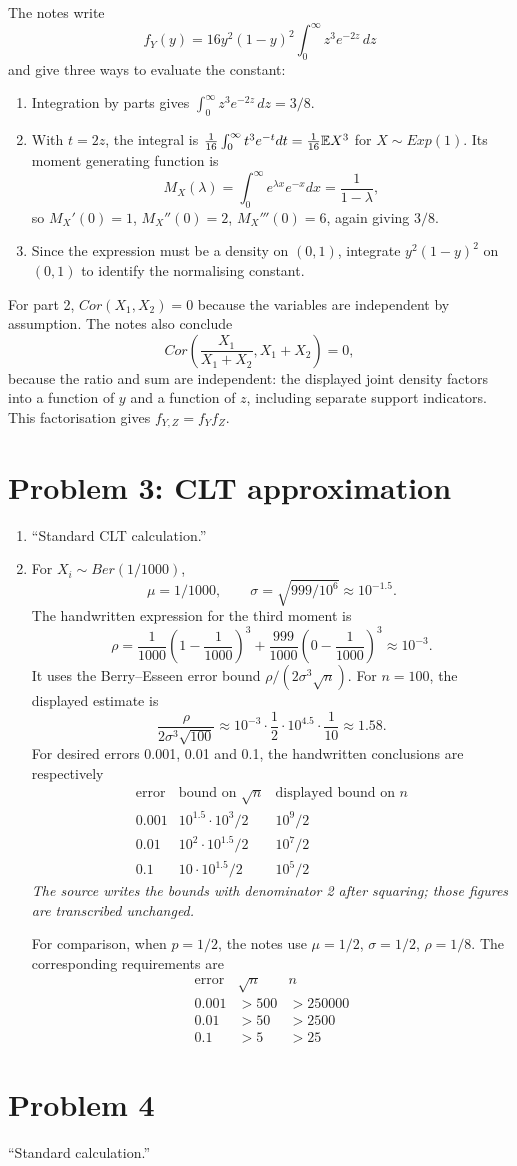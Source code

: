 \documentclass[a4paper]{article}
\begin{document}
The notes write
\[f_Y(y)=16y^2(1-y)^2\int_0^\infty z^3e^{-2z}\,dz\]
and give three ways to evaluate the constant:
\begin{enumerate}
\item Integration by parts gives $\int_0^\infty z^3e^{-2z}\,dz=3/8$.
\item With $t=2z$, the integral is $\frac1{16}\int_0^\infty t^3e^{-t}dt=\frac1{16}\mathbb {E} X^3$ for $X\sim Exp(1)$. Its moment generating function is
\[M_X(\lambda)=\int_0^\infty e^{\lambda x}e^{-x}dx=\frac1{1-\lambda},\]
so $M_X'(0)=1$, $M_X''(0)=2$, $M_X'''(0)=6$, again giving $3/8$.
\item Since the expression must be a density on $(0,1)$, integrate $y^2(1-y)^2$ on $(0,1)$ to identify the normalising constant.
\end{enumerate}
For part 2, $Cor(X_1,X_2)=0$ because the variables are independent by assumption. The notes also conclude
\[Cor\left(\frac{X_1}{X_1+X_2},X_1+X_2\right)=0,\]
because the ratio and sum are independent: the displayed joint density factors into a function of $y$ and a function of $z$, including separate support indicators. This factorisation gives $f_{Y,Z}=f_Yf_Z$.
\section*{Problem 3: CLT approximation}
\begin{enumerate}
\item ``Standard CLT calculation.''
\item For $X_i\sim Ber(1/1000)$,
\[\mu=1/1000,\qquad\sigma=\sqrt{999/10^6}\approx10^{-1.5}.\]
The handwritten expression for the third moment is
\[\rho=\frac1{1000}\left(1-\frac1{1000}\right)^3+\frac{999}{1000}\left(0-\frac1{1000}\right)^3\approx10^{-3}.\]
It uses the Berry--Esseen error bound $\rho/(2\sigma^3\sqrt n)$. For $n=100$, the displayed estimate is
\[\frac\rho{2\sigma^3\sqrt{100}}\approx10^{-3}\cdot\frac12\cdot10^{4.5}\cdot\frac1{10}\approx1.58.\]
For desired errors 0.001, 0.01 and 0.1, the handwritten conclusions are respectively
\[\begin{array}{c|c|c}
\text{error}&\text{bound on }\sqrt n&\text{displayed bound on }n\\\hline
0.001&10^{1.5}\cdot10^3/2&10^9/2\\
0.01&10^2\cdot10^{1.5}/2&10^7/2\\
0.1&10\cdot10^{1.5}/2&10^5/2
\end{array}\]
\textit{The source writes the bounds with denominator 2 after squaring; those figures are transcribed unchanged.}

For comparison, when $p=1/2$, the notes use $\mu=1/2$, $\sigma=1/2$, $\rho=1/8$. The corresponding requirements are
\[\begin{array}{c|c|c}\text{error}&\sqrt n&n\\\hline0.001&>500&>250000\\0.01&>50&>2500\\0.1&>5&>25\end{array}\]
\end{enumerate}
\section*{Problem 4}
``Standard calculation.''
\end{document}
